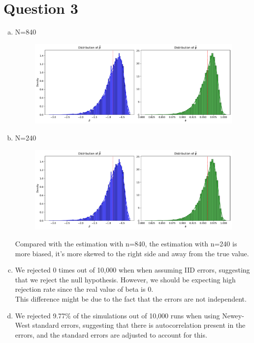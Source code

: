 
\section*{Question 3}

\begin{enumerate}[(a)]
    \item
    N=840\\
    \begin{figure}[h]
        \centering
        \includegraphics[width=0.9\linewidth]{Out/EX3-1.pdf}
        
    \end{figure}

  \item
    N=240\\
    \begin{figure}[h]
        \centering
        \includegraphics[width=0.9\linewidth]{Out/EX3-2.pdf}
        
    \end{figure}
Compared with the estimation with n=840, the estimation with n=240 is more biased, it's more skewed to the right side and away from the true value.
\item 
We rejected 0 times out of 10,000 when when assuming IID errors, 
suggesting that we reject the null hypothesis. 
However, we should be expecting high rejection rate since the real value of beta is 0.\\
This difference might be due to the fact that the errors are not independent.\\

\item 
We rejected 9.77\% of the simulations out of 10,000 runs when using Newey-West standard errors, suggesting that there is autocorrelation present in the errors, and the standard errors are adjusted to account for this.\\

\end{enumerate}

